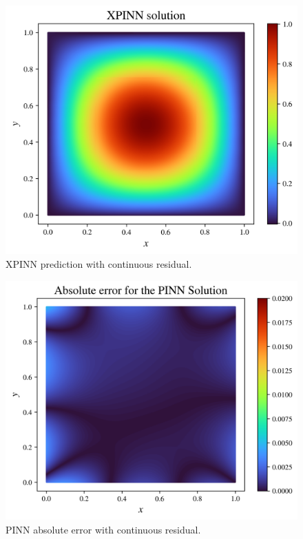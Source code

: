 \begin{figure}[h]
    \centering
    \includegraphics[width=\linewidth]{Project1XPINNs/figures/Poisson/smooth_xpinn_Poisson_solution.png}
    \caption{XPINN prediction with continuous residual.}
    \label{fig:xpinn_smooth_pred}
\end{figure}


\begin{figure}[h]
    \centering
    \includegraphics[width=\linewidth]{Project1XPINNs/figures/Poisson/smooth_single_Poisson_error.png}
    \caption{PINN absolute error with continuous residual.}
    \label{fig:pinn_smooth_error}
\end{figure}

